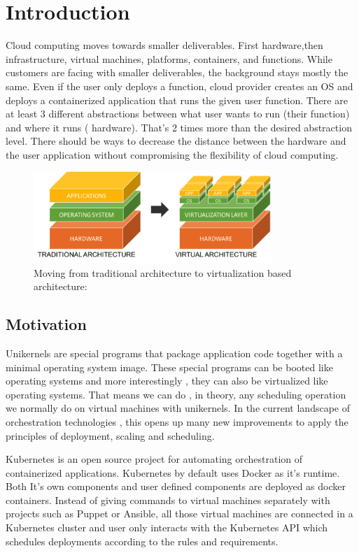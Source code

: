 
\chapter{Introduction}\label{chapter:introduction}
Cloud computing moves towards smaller deliverables. First hardware,then infrastructure, virtual machines, platforms, containers, and functions. While customers are facing with smaller deliverables, the background stays mostly the same. Even if the user only deploys a function, cloud provider creates an OS and deploys a containerized application that runs the given user function. There are at least 3 different abstractions between what user wants to run (their function) and where it runs ( hardware). That's 2 times more than the desired abstraction level. There should be ways to decrease the distance between the hardware and the user application without compromising the flexibility of cloud computing. 
\begin{figure}[htpb]
  \centering
  \includegraphics[width=0.8\textwidth]{figures/1-123.png}
  \caption{Moving from traditional architecture to virtualization based architecture: \cite{arch-photo} } \label{fig:arch}
\end{figure}
\section{Motivation}
Unikernels are special programs that package application code together with a minimal operating system image.\cite{7396164} These special programs can be booted like operating systems and more interestingly , they can also be virtualized like operating systems. That means we can do , in theory, any scheduling operation we normally do on virtual machines with unikernels. In the current landscape of orchestration technologies , this opens up many new improvements to apply the principles of deployment, scaling and scheduling.

Kubernetes is an open source project for automating orchestration of containerized applications. \cite{Hightower:2017:KUR:3175917} Kubernetes by default uses Docker as it's runtime. Both It's own components and user defined components are deployed as docker containers. Instead of giving commands to virtual machines separately with projects such as Puppet or Ansible, all those virtual machines are connected in a Kubernetes cluster and user only interacts with the Kubernetes API which schedules deployments according to the rules and requirements.

